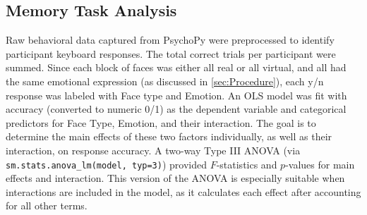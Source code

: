 \subsection{Memory Task Analysis}
\label{sec:memory_task_analysis}
Raw behavioral data captured from PsychoPy were preprocessed to identify participant keyboard responses. 
The total correct trials per participant were summed. 
Since each block of faces was either all real or all virtual, and all had the same emotional expression (as discussed in \ref{sec:Procedure}), each y/n response was labeled with Face type and Emotion.
An OLS model was fit with accuracy (converted to numeric 0/1) as the dependent variable and categorical predictors for Face Type, Emotion, and their interaction. 
The goal is to determine the main effects of these two factors individually, as well as their interaction, on response accuracy.
A two-way Type III ANOVA (via \texttt{sm.stats.anova\_lm(model, typ=3)}) provided $F$-statistics and $p$-values for main effects and interaction.
This version of the ANOVA is especially suitable when interactions are included in the model, as it calculates each effect after accounting for all other terms.